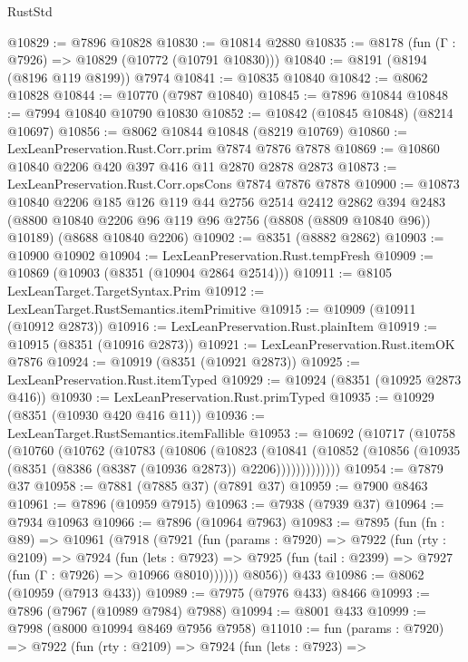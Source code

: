 \begin{lexlean}{RustStd}
\begin{coremodule}
@10829 := @7896 @10828
@10830 := @10814 @2880
@10835 := @8178 (fun (Γ : @7926) => @10829 (@10772 (@10791 @10830)))
@10840 := @8191 (@8194 (@8196 @119 @8199)) @7974
@10841 := @10835 @10840
@10842 := @8062 @10828
@10844 := @10770 (@7987 @10840)
@10845 := @7896 @10844
@10848 := @7994 @10840 @10790 @10830
@10852 := @10842 (@10845 @10848) (@8214 @10697)
@10856 := @8062 @10844 @10848 (@8219 @10769)
@10860 := LexLeanPreservation.Rust.Corr.prim @7874 @7876 @7878
@10869 := @10860 @10840 @2206 @420 @397 @416 @11 @2870 @2878 @2873
@10873 := LexLeanPreservation.Rust.Corr.opsCons @7874 @7876 @7878
@10900 := @10873
    @10840
    @2206
    @185
    @126
    @119
    @44
    @2756
    @2514
    @2412
    @2862
    @394
    @2483
    (@8800 @10840 @2206 @96 @119 @96 @2756 (@8808 (@8809 @10840 @96)) @10189)
    (@8688 @10840 @2206)
@10902 := @8351 (@8882 @2862)
@10903 := @10900 @10902
@10904 := LexLeanPreservation.Rust.tempFresh
@10909 := @10869 (@10903 (@8351 (@10904 @2864 @2514)))
@10911 := @8105 LexLeanTarget.TargetSyntax.Prim
@10912 := LexLeanTarget.RustSemantics.itemPrimitive
@10915 := @10909 (@10911 (@10912 @2873))
@10916 := LexLeanPreservation.Rust.plainItem
@10919 := @10915 (@8351 (@10916 @2873))
@10921 := LexLeanPreservation.Rust.itemOK @7876
@10924 := @10919 (@8351 (@10921 @2873))
@10925 := LexLeanPreservation.Rust.itemTyped
@10929 := @10924 (@8351 (@10925 @2873 @416))
@10930 := LexLeanPreservation.Rust.primTyped
@10935 := @10929 (@8351 (@10930 @420 @416 @11))
@10936 := LexLeanTarget.RustSemantics.itemFallible
@10953 := @10692
    (@10717
      (@10758
        (@10760
          (@10762
            (@10783
              (@10806
                (@10823
                  (@10841
                    (@10852 (@10856 (@10935 (@8351 (@8386 (@8387 (@10936 @2873)) @2206)))))))))))))
@10954 := @7879 @37
@10958 := @7881 (@7885 @37) (@7891 @37)
@10959 := @7900 @8463
@10961 := @7896 (@10959 @7915)
@10963 := @7938 (@7939 @37)
@10964 := @7934 @10963
@10966 := @7896 (@10964 @7963)
@10983 := @7895
    (fun (fn : @89) =>
    @10961
      (@7918
        (@7921
          (fun (params : @7920) =>
          @7922
            (fun (rty : @2109) =>
            @7924
              (fun (lets : @7923) =>
              @7925 (fun (tail : @2399) => @7927 (fun (Γ : @7926) => @10966 @8010))))))
        @8056))
    @433
@10986 := @8062 (@10959 (@7913 @433))
@10989 := @7975 (@7976 @433) @8466
@10993 := @7896 (@7967 (@10989 @7984) @7988)
@10994 := @8001 @433
@10999 := @7998 (@8000 @10994 @8469 @7956 @7958)
@11010 := fun (params : @7920) =>
  @7922
    (fun (rty : @2109) =>
    @7924
      (fun (lets : @7923) =>

\end{coremodule}
\end{lexlean}
